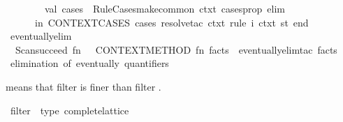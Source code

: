 \begin{isabellebody}
\ \ \ \ \ \ \ \ val\ cases\ {\isacharequal}{\kern0pt}\ Rule{\isacharunderscore}{\kern0pt}Cases{\isachardot}{\kern0pt}make{\isacharunderscore}{\kern0pt}common\ ctxt\ cases{\isacharunderscore}{\kern0pt}prop\ {\isacharbrackleft}{\kern0pt}{\isacharparenleft}{\kern0pt}{\isacharparenleft}{\kern0pt}{\isachardoublequote}{\kern0pt}elim{\isachardoublequote}{\kern0pt}{\isacharcomma}{\kern0pt}\ {\isacharbrackleft}{\kern0pt}{\isacharbrackright}{\kern0pt}{\isacharparenright}{\kern0pt}{\isacharcomma}{\kern0pt}\ {\isacharbrackleft}{\kern0pt}{\isacharbrackright}{\kern0pt}{\isacharparenright}{\kern0pt}{\isacharbrackright}{\kern0pt}\isanewline
\ \ \ \ \ \ in\ CONTEXT{\isacharunderscore}{\kern0pt}CASES\ cases\ {\isacharparenleft}{\kern0pt}resolve{\isacharunderscore}{\kern0pt}tac\ ctxt\ {\isacharbrackleft}{\kern0pt}rule{\isacharbrackright}{\kern0pt}\ i{\isacharparenright}{\kern0pt}\ {\isacharparenleft}{\kern0pt}ctxt{\isacharcomma}{\kern0pt}\ st{\isacharparenright}{\kern0pt}\ end{\isacharparenright}{\kern0pt}\isanewline
{\isacartoucheclose}\isanewline
\isanewline
{}\isamarkupfalse%
\ eventually{\isacharunderscore}{\kern0pt}elim\ {\isacharequal}{\kern0pt}\ {\isacartoucheopen}\isanewline
\ \ Scan{\isachardot}{\kern0pt}succeed\ {\isacharparenleft}{\kern0pt}fn\ {\isacharunderscore}{\kern0pt}\ {\isacharequal}{\kern0pt}{\isachargreater}{\kern0pt}\ CONTEXT{\isacharunderscore}{\kern0pt}METHOD\ {\isacharparenleft}{\kern0pt}fn\ facts\ {\isacharequal}{\kern0pt}{\isachargreater}{\kern0pt}\ eventually{\isacharunderscore}{\kern0pt}elim{\isacharunderscore}{\kern0pt}tac\ facts\ {}{\isacharparenright}{\kern0pt}{\isacharparenright}{\kern0pt}\isanewline
{\isacartoucheclose}\ {\isachardoublequoteopen}elimination\ of\ eventually\ quantifiers{\isachardoublequoteclose}%
\endisatagML
{\isafoldML}%
%
\isadelimML
%
\endisadelimML
%
\isadelimdocument
%
\endisadelimdocument
%
\isatagdocument
%
\isamarkuptrue%
%
\endisatagdocument
{\isafolddocument}%
%
\isadelimdocument
%
\endisadelimdocument
%
\begin{isamarkuptext}%
 means that filter  is finer than
filter .%
\end{isamarkuptext}\isamarkuptrue%
\isamarkupfalse%
\ filter\ {\isacharcolon}{\kern0pt}{\isacharcolon}{\kern0pt}\ {\isacharparenleft}{\kern0pt}type{\isacharparenright}{\kern0pt}\ complete{\isacharunderscore}{\kern0pt}lattice\isanewline
{}\isanewline

\end{isabellebody}
